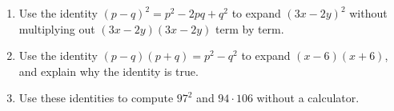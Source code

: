 \begin{enumerate}
\item[(a)] Use the identity $(p-q)^2=p^2-2pq+q^2$ to expand $(3x-2y)^2$ without multiplying out $(3x-2y)(3x-2y)$ term by term.
\item[(b)] Use the identity $(p-q)(p+q)=p^2-q^2$ to expand $(x-6)(x+6)$, and explain why the identity is true.
\item[(c)] Use these identities to compute $97^2$ and $94\cdot106$ without a calculator.
\end{enumerate}
